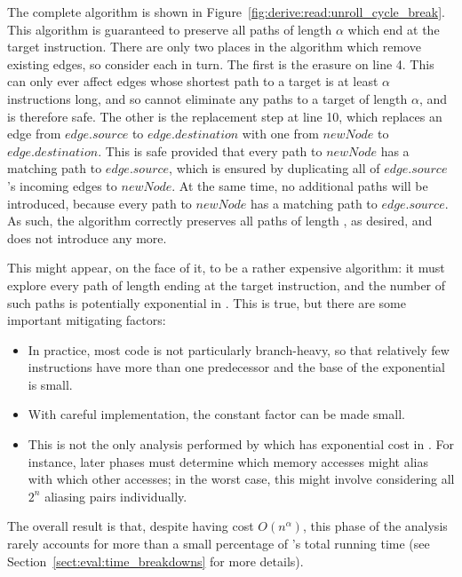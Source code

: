 The complete algorithm is shown in
Figure~\ref{fig:derive:read:unroll_cycle_break}.  This algorithm is
guaranteed to preserve all paths of length $\alpha$ which end at the
target instruction.  There are only two places in the algorithm which
remove existing edges, so consider each in turn.  The first is the
erasure on line 4.  This can only ever affect edges whose shortest
path to a target is at least $\alpha$ instructions long, and so cannot
eliminate any paths to a target of length $\alpha$, and is therefore
safe.  The other is the replacement step at line 10, which replaces an
edge from $edge.source$ to $edge.destination$ with one from $newNode$
to $edge.destination$.  This is safe provided that every path to
$newNode$ has a matching path to $edge.source$, which is ensured by
duplicating all of $edge.source$'s incoming edges to $newNode$.  At
the same time, no additional paths will be introduced, because every
path to $newNode$ has a matching path to $edge.source$.  As such, the
algorithm correctly preserves all paths of length \backref{$\alpha$},
as desired, and does not introduce any more.

This might appear, on the face of it, to be a rather expensive
algorithm: it must explore every path of length \backref{$\alpha$}
ending at the target instruction, and the number of such paths is
potentially exponential in \backref{$\alpha$}.  This is true, but
there are some important mitigating factors:

\begin{itemize}
\item In practice, most code is not particularly branch-heavy, so that
  relatively few instructions have more than one predecessor and the
  base of the exponential is small.
\item With careful implementation, the constant factor can be made
  small.
\item This is not the only analysis performed by {\technique} which
  has exponential cost in \backref{$\alpha$}.  For instance, later
  phases must determine which memory accesses might alias with which
  other accesses; in the worst case, this might involve considering
  all $2^n$ aliasing pairs individually.
\end{itemize}

The overall result is that, despite having cost $O(n^{\alpha})$, this
phase of the analysis rarely accounts for more than a small percentage
of {\implementation}'s total running time (see
Section~\ref{sect:eval:time_breakdowns} for more details).
  

